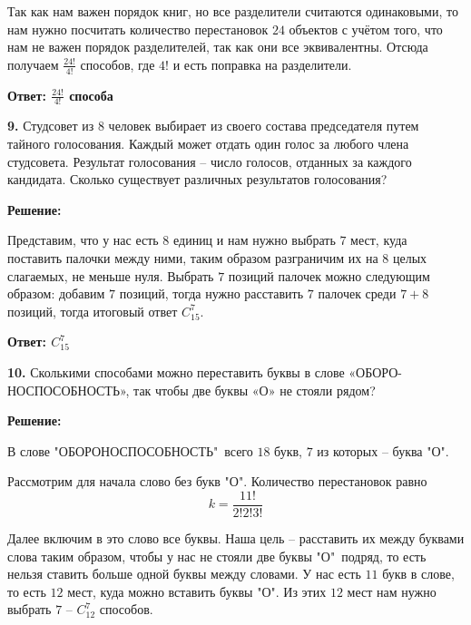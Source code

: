 \documentclass[a4paper,12pt]{article} %
\begin{document}
Так как нам важен порядок книг, но все разделители считаются одинаковыми, то нам нужно посчитать количество перестановок $24$ объектов с учётом того, что нам не важен порядок разделителей, так как они все эквивалентны. Отсюда получаем $\frac{24!}{4!}$ способов, где $4!$ и есть поправка на разделители.

\begin{flushright}
\begin{large}
\textbf {Ответ: $\frac{24!}{4!}$ способа}
\end{large}
\end{flushright}

{\bf 9.} Студсовет из 8 человек выбирает из своего состава председателя
путем тайного голосования. Каждый может отдать один голос за любого
члена студсовета. Результат голосования – число голосов, отданных
за каждого кандидата. Сколько существует различных результатов
голосования?
\newpage
\begin{center}
\bfseries
{\Large Решение: }
\end{center}

Представим, что у нас есть $8$ единиц и нам нужно выбрать $7$ мест, куда поставить палочки между ними, таким образом разграничим их на $8$ целых слагаемых, не меньше нуля. Выбрать $7$ позиций палочек можно следующим образом: добавим $7$ позиций, тогда нужно расставить $7$ палочек среди $7+8$ позиций, тогда итоговый ответ $C^7_{15}$.

\begin{flushright}
\begin{large}
\textbf {Ответ: $C^7_{15}$}
\end{large}
\end{flushright}

{\bf 10.} Сколькими способами можно переставить буквы в слове «ОБОРО-
НОСПОСОБНОСТЬ», так чтобы две буквы «О» не стояли рядом?
\begin{center}
\bfseries
{\Large Решение: }
\end{center}

В слове "ОБОРОНОСПОСОБНОСТЬ"\ всего $18$ букв, $7$ из которых -- буква "О".

Рассмотрим для начала слово без букв "О". Количество перестановок равно
\[k = \frac{11!}{2!2!3!}\]

Далее включим в это слово все буквы. Наша цель -- расставить их между буквами слова таким образом, чтобы у нас не стояли две буквы "О"\ подряд, то есть нельзя ставить больше одной буквы между словами. У нас есть $11$ букв в слове, то есть $12$ мест, куда можно вставить буквы "О". Из этих $12$ мест нам нужно выбрать $7$ -- $C^7_{12}$ способов.
\end{document}
